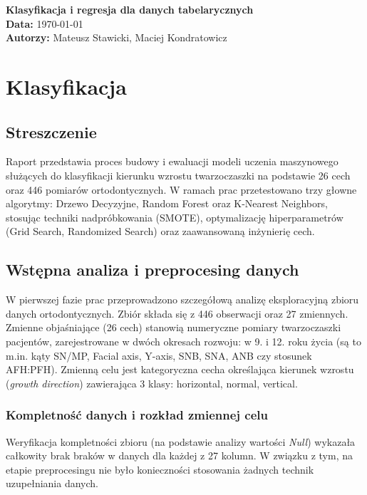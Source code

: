 \documentclass[12pt, a4paper]{article}
\begin{document}
\begin{center}
    {\Large \textbf{Klasyfikacja i regresja dla danych tabelarycznych}}\\[0.5em]
    \textbf{Data:} \today\\
    \textbf{Autorzy:} Mateusz Stawicki, Maciej Kondratowicz
\end{center}

\tableofcontents
\newpage

\section{Klasyfikacja}

\subsection{Streszczenie}

Raport przedstawia proces budowy i ewaluacji modeli uczenia maszynowego służących do klasyfikacji kierunku wzrostu twarzoczaszki na podstawie 26 cech oraz 446 pomiarów ortodontycznych. W ramach prac przetestowano trzy głowne algorytmy: Drzewo Decyzyjne, Random Forest oraz K-Nearest Neighbors, stosując techniki nadpróbkowania (SMOTE), optymalizację hiperparametrów (Grid Search, Randomized Search) oraz zaawansowaną inżynierię cech.

\subsection{Wstępna analiza i preprocesing danych}

W pierwszej fazie prac przeprowadzono szczegółową analizę eksploracyjną zbioru danych ortodontycznych. Zbiór składa się z 446 obserwacji oraz 27 zmiennych. Zmienne objaśniające (26 cech) stanowią numeryczne pomiary twarzoczaszki pacjentów, zarejestrowane w dwóch okresach rozwoju: w 9. i 12. roku życia (są to m.in. kąty SN/MP, Facial axis, Y-axis, SNB, SNA, ANB czy stosunek AFH:PFH). Zmienną celu jest kategoryczna cecha określająca kierunek wzrostu (\textit{growth direction}) zawierająca 3 klasy: horizontal, normal, vertical.

\subsubsection{Kompletność danych i rozkład zmiennej celu}

Weryfikacja kompletności zbioru (na podstawie analizy wartości \textit{Null}) wykazała całkowity brak braków w danych dla każdej z 27 kolumn. W związku z tym, na etapie preprocesingu nie było konieczności stosowania żadnych technik uzupełniania danych.
\end{document}
